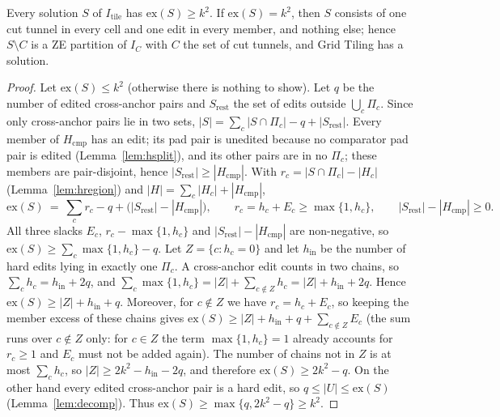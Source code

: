 \begin{theorem}[Soundness]\label{thm:hS}
Every solution $S$ of $I_{\mathrm{tile}}$ has $\mathrm{ex}(S)\ge k^2$. If $\mathrm{ex}(S)=k^2$, then $S$ consists of one cut tunnel in every cell and one edit in every member, and nothing else; hence $S\setminus C$ is a ZE partition of $I_C$ with $C$ the set of cut tunnels, and Grid Tiling has a solution.
\end{theorem}
\begin{proof}
Let $\mathrm{ex}(S)\le k^2$ (otherwise there is nothing to show). Let $q$ be the number of edited cross-anchor pairs and $S_{\mathrm{rest}}$ the set of edits outside $\bigcup_c\Pi_c$. Since only cross-anchor pairs lie in two sets, $|S|=\sum_c|S\cap\Pi_c|-q+|S_{\mathrm{rest}}|$. Every member of $H_{\mathrm{cmp}}$ has an edit; its pad pair is unedited because no comparator pad pair is edited (Lemma~\ref{lem:hsplit}), and its other pairs are in no $\Pi_c$; these members are pair-disjoint, hence $|S_{\mathrm{rest}}|\ge|H_{\mathrm{cmp}}|$. With $r_c=|S\cap\Pi_c|-|H_c|$ (Lemma~\ref{lem:hregion}) and $|H|=\sum_c|H_c|+|H_{\mathrm{cmp}}|$,
\[
\mathrm{ex}(S)\ =\ \sum_c r_c-q+\bigl(|S_{\mathrm{rest}}|-|H_{\mathrm{cmp}}|\bigr),\qquad r_c=h_c+E_c\ge\max\{1,h_c\},\qquad |S_{\mathrm{rest}}|-|H_{\mathrm{cmp}}|\ge0 .
\]
All three slacks $E_c$, $r_c-\max\{1,h_c\}$ and $|S_{\mathrm{rest}}|-|H_{\mathrm{cmp}}|$ are non-negative, so $\mathrm{ex}(S)\ge\sum_c\max\{1,h_c\}-q$.
Let $Z=\{c:h_c=0\}$ and let $h_{\mathrm{in}}$ be the number of hard edits lying in exactly one $\Pi_c$. A cross-anchor edit counts in two chains, so $\sum_ch_c=h_{\mathrm{in}}+2q$, and $\sum_c\max\{1,h_c\}=|Z|+\sum_{c\notin Z}h_c=|Z|+h_{\mathrm{in}}+2q$. Hence $\mathrm{ex}(S)\ge|Z|+h_{\mathrm{in}}+q$. Moreover, for $c\notin Z$ we have $r_c=h_c+E_c$, so keeping the member excess of these chains gives $\mathrm{ex}(S)\ge|Z|+h_{\mathrm{in}}+q+\sum_{c\notin Z}E_c$ (the sum runs over $c\notin Z$ only: for $c\in Z$ the term $\max\{1,h_c\}=1$ already accounts for $r_c\ge1$ and $E_c$ must not be added again). The number of chains not in $Z$ is at most $\sum_ch_c$, so $|Z|\ge2k^2-h_{\mathrm{in}}-2q$, and therefore $\mathrm{ex}(S)\ge2k^2-q$. On the other hand every edited cross-anchor pair is a hard edit, so $q\le|U|\le\mathrm{ex}(S)$ (Lemma~\ref{lem:decomp}). Thus $\mathrm{ex}(S)\ge\max\{q,2k^2-q\}\ge k^2$.


\end{proof}

